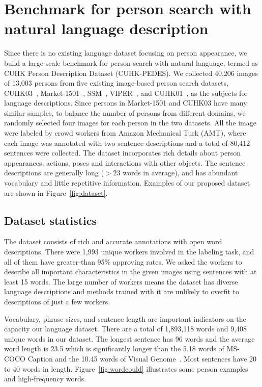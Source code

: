 \section{Benchmark for person search with natural language description} %
Since there is no existing language dataset focusing on person appearance, we build a large-scale benchmark for person search with natural language, termed as CUHK Person Description Dataset (CUHK-PEDES). We collected 40,206 images of 13,003 persons from five existing image-based person search datasets, CUHK03~\cite{li2014deepreid}, Market-1501~\cite{zheng2015person}, SSM~\cite{xiao2016end}, VIPER~\cite{gray2007evaluating}, and CUHK01~\cite{li2012human}, as the subjects for language descriptions. Since persons in Market-1501 and CUHK03 have many similar samples, to balance the number of persons from different domains, we randomly selected four images for each person in the two datasets.
All the image were labeled by crowd workers from Amazon Mechanical Turk (AMT), where each image was annotated with two sentence descriptions and a total of 80,412 sentences were collected.
The dataset incorporates rich details about person appearances, actions, poses and interactions with other objects. The sentence descriptions are generally long ($>23$ words in average), and has abundant vocabulary and little repetitive information. Examples of our proposed dataset are shown in Figure~\ref{fig:dataset}.

\subsection{Dataset statistics}
The dataset consists of rich and accurate annotations with open word descriptions. There were 1,993 unique workers involved in the labeling task, and all of them have greater-than 95\% approving rates. We asked the workers to describe all important characteristics in the given images using sentences with at least 15 words. 
The large number of workers means the dataset has diverse language descriptions and methods trained with it are unlikely to overfit to descriptions of just a few workers.

Vocabulary, phrase sizes, and sentence length are important indicators on the capacity our language dataset. There are a total of 1,893,118 words and 9,408 unique words in our dataset. 
The longest sentence has 96 words and the average word length is 23.5 which is significantly longer than the 5.18 words of MS-COCO Caption \cite{lin2014microsoft} and the 10.45 words of Visual Genome~\cite{krishna2016visual}. Most sentences have 20 to 40 words in length. Figure~\ref{fig:wordcould} illustrates some person examples and high-frequency words.


